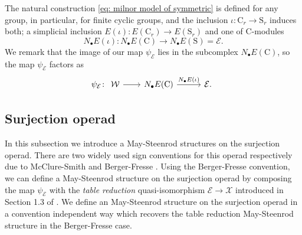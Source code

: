 \begin{remark}
	The natural construction \eqref{eq: milnor model of symmetric} is defined for any group, in particular, for finite cyclic groups, and the inclusion $\iota \colon \mathrm C_r \to \mathrm S_r$ induces both; a simplicial inclusion $E(\iota) \colon E(\mathrm C_r) \to E(\mathrm S_r)$ and one of $\mathrm C$-modules
	\begin{equation*}
	N_\bullet E(\iota) \colon N_\bullet E(\mathrm C) \to N_\bullet E(\mathrm S) = \mathcal E.
	\end{equation*}
	We remark that the image of our map $\psi_{\mathcal E}$ lies in the subcomplex $N_\bullet E(\mathrm C)$, so the map $\psi_{\mathcal E}$ factors as
	\begin{equation*}
	\psi_{\mathcal E} \colon
	\begin{tikzcd}
	\mathcal W \arrow[r] &[-3pt] N_\bullet E(\mathrm C) \arrow[r, "N_\bullet E(\iota)"] &[5pt] \mathcal E.
	\end{tikzcd}
	\end{equation*}
\end{remark}

\subsection{Surjection operad}

In this subsection we introduce a May-Steenrod structures on the surjection operad.
There are two widely used sign conventions for this operad respectively due to McClure-Smith \cite{mcclure03cochain} and Berger-Fresse \cite{berger04combinatorial}.
Using the Berger-Fresse convention, we can define a May-Steenrod structure on the surjection operad by composing the map $\psi_{\mathcal E}$ with the \textit{table reduction} quasi-isomorphism $\mathcal E \to \mathcal X$ introduced in Section 1.3 of \cite{berger04combinatorial}.
We define an May-Steenrod structure on the surjection operad in a convention independent way which recovers the table reduction May-Steenrod structure in the Berger-Fresse case.


